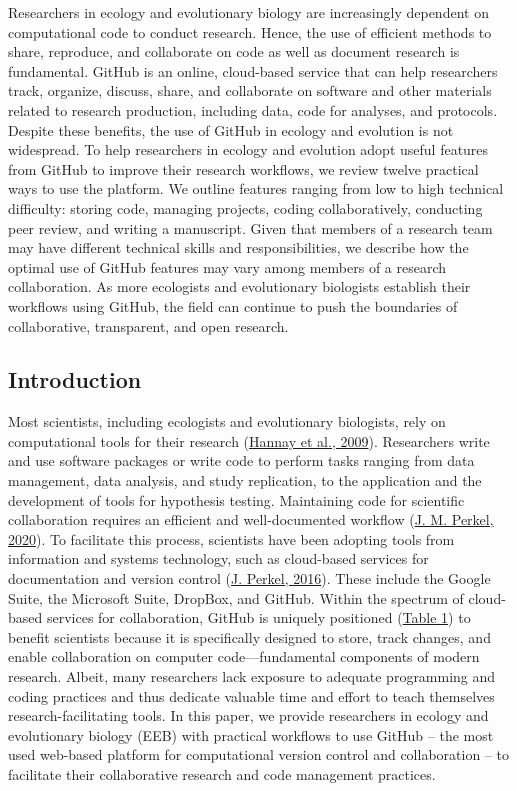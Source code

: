Researchers in ecology and evolutionary biology are increasingly dependent on computational code to conduct research.
Hence, the use of efficient methods to share, reproduce, and collaborate on code as well as document research is fundamental.
GitHub is an online, cloud-based service that can help researchers track, organize, discuss, share, and collaborate on software and other materials related to research production, including data, code for analyses, and protocols.
Despite these benefits, the use of GitHub in ecology and evolution is not widespread.
To help researchers in ecology and evolution adopt useful features from GitHub to improve their research workflows, we review twelve practical ways to use the platform.
We outline features ranging from low to high technical difficulty: storing code, managing projects, coding collaboratively, conducting peer review, and writing a manuscript.
Given that members of a research team may have different technical skills and responsibilities, we describe how the optimal use of GitHub features may vary among members of a research collaboration.
As more ecologists and evolutionary biologists establish their workflows using GitHub, the field can continue to push the boundaries of collaborative, transparent, and open research.

\hypertarget{introduction}{%
\subsection{Introduction}\label{introduction}}

Most scientists, including ecologists and evolutionary biologists, rely on computational tools for their research (\protect\hyperlink{ref-fJWFe93e}{Hannay et al., 2009}).
Researchers write and use software packages or write code to perform tasks ranging from data management, data analysis, and study replication, to the application and the development of tools for hypothesis testing.
Maintaining code for scientific collaboration requires an efficient and well-documented workflow (\protect\hyperlink{ref-1Kqna6l2}{J. M. Perkel, 2020}).
To facilitate this process, scientists have been adopting tools from information and systems technology, such as cloud-based services for documentation and version control (\protect\hyperlink{ref-10ghgV3S8}{J. Perkel, 2016}).
These include the Google Suite, the Microsoft Suite, DropBox, and GitHub.
Within the spectrum of cloud-based services for collaboration, GitHub is uniquely positioned (\protect\hyperlink{tbl:compare}{Table 1}) to benefit scientists because it is specifically designed to store, track changes, and enable collaboration on computer code---fundamental components of modern research.
Albeit, many researchers lack exposure to adequate programming and coding practices and thus dedicate valuable time and effort to teach themselves research-facilitating tools.
In this paper, we provide researchers in ecology and evolutionary biology (EEB) with practical workflows to use GitHub -- the most used web-based platform for computational version control and collaboration -- to facilitate their collaborative research and code management practices.

